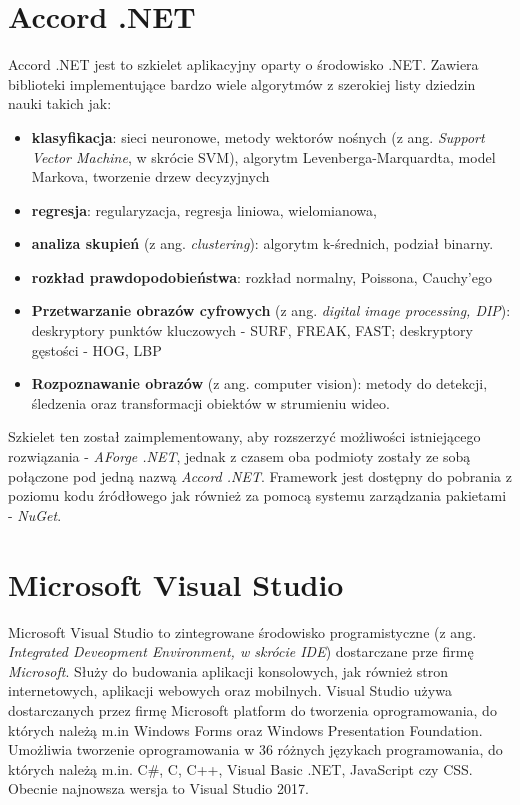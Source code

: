 \section{Accord .NET}
Accord .NET jest to szkielet aplikacyjny oparty o środowisko .NET. Zawiera biblioteki implementujące bardzo wiele algorytmów z szerokiej listy dziedzin nauki takich jak:

\begin{itemize}
	\item \textbf{klasyfikacja}: sieci neuronowe, metody wektorów nośnych (z ang. \textit{Support Vector Machine}, w skrócie SVM), algorytm Levenberga-Marquardta, model Markova, tworzenie drzew decyzyjnych
	\item \textbf{regresja}: regularyzacja, regresja liniowa, wielomianowa, 
	\item \textbf{analiza skupień} (z ang. \textit{clustering}): algorytm k-średnich, podział binarny. 
	\item \textbf{rozkład prawdopodobieństwa}: rozkład normalny, Poissona, Cauchy'ego
	\item \textbf{Przetwarzanie obrazów cyfrowych} (z ang. \textit{digital image processing, DIP}): deskryptory punktów kluczowych - SURF, FREAK, FAST; deskryptory gęstości - HOG, LBP
	\item \textbf{Rozpoznawanie obrazów} (z ang. computer vision): metody do detekcji, śledzenia oraz transformacji obiektów w strumieniu wideo. 
\end{itemize}

Szkielet ten został zaimplementowany, aby rozszerzyć możliwości istniejącego rozwiązania - \textit{AForge .NET}, jednak z czasem oba podmioty zostały ze sobą połączone pod jedną nazwą \textit{Accord .NET}. Framework jest dostępny do pobrania z poziomu kodu źródłowego jak również za pomocą systemu zarządzania pakietami - \textit{NuGet}.

\section{Microsoft Visual Studio}
Microsoft Visual Studio to zintegrowane środowisko programistyczne (z ang. \textit{Integrated Deveopment Environment, w skrócie IDE}) dostarczane prze firmę \textit{Microsoft}. Służy do budowania aplikacji konsolowych, jak również stron internetowych, aplikacji webowych oraz mobilnych. Visual Studio używa dostarczanych przez firmę Microsoft platform do tworzenia oprogramowania, do których należą m.in Windows Forms oraz Windows Presentation Foundation. Umożliwia tworzenie oprogramowania w 36 różnych językach programowania, do których należą m.in. C\#, C, C++, Visual Basic .NET, JavaScript czy CSS. Obecnie najnowsza wersja to Visual Studio 2017. 

